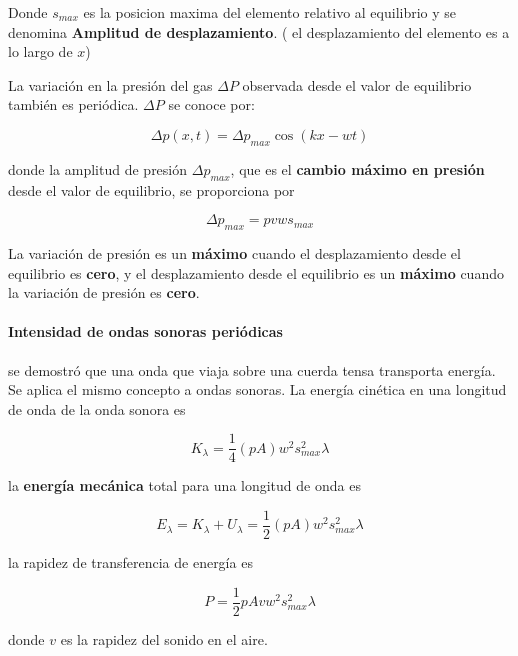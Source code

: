\documentclass[10pt]{article}
\begin{document}
Donde $s_{max}$ es la posicion maxima del elemento relativo al equilibrio y se denomina \textbf{Amplitud de desplazamiento}.
( el desplazamiento del elemento es a lo largo de $x$)

La variación en la presión del gas $\Delta P$ observada desde el valor de equilibrio también es
periódica. $\Delta P$ se conoce por:

\begin{equation*}
 	\Delta p(x,t) = \Delta p_{max} \cos(kx-wt)
\end{equation*}

donde la amplitud de presión $\Delta p_{max}$, que es el \textbf{cambio máximo en presión} desde el valor
de equilibrio, se proporciona por

\begin{equation*}
	\Delta p_{max} = pvws_{max}
\end{equation*}

La variación de presión es un \textbf{máximo} cuando el desplazamiento
desde el equilibrio es \textbf{cero}, y el desplazamiento desde el equilibrio es un \textbf{máximo} cuando
la variación de presión es \textbf{cero}.

\paragraph{Intensidad de ondas sonoras periódicas}

se demostró que una onda que viaja sobre una cuerda tensa transporta
energía. Se aplica el mismo concepto a ondas sonoras. La energía cinética en una longitud de onda de
la onda sonora es

\begin{equation*}
	K_{\lambda} = \frac{1}{4} (pA)w^2s^2_{max}\lambda	
\end{equation*}

la \textbf{energía mecánica} total para una longitud de onda es

\begin{equation*}
	E_{\lambda} = K_{\lambda} + U_{\lambda}  = \frac{1}{2} (pA)w^2s^2_{max}\lambda
\end{equation*}

la rapidez de transferencia de energía es

\begin{equation*}
	P = \frac{1}{2} pAvw^2s^2_{max}\lambda
\end{equation*}

donde $v$ es la rapidez del sonido en el aire.
\end{document}
